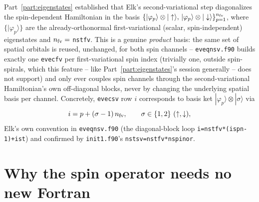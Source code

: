 \documentclass[11pt]{article}
\begin{document}
Part~\ref{part:eigenstates} established that Elk's second-variational step diagonalizes the
spin-dependent Hamiltonian in the basis
$\{|\varphi_p\rangle\otimes|\uparrow\rangle,\,|\varphi_p\rangle\otimes|\downarrow\rangle\}_{p=1}^{n_{\rm fv}}$,
where $\{|\varphi_p\rangle\}$ are the already-orthonormal first-variational (scalar,
spin-independent) eigenstates and $n_{\rm fv}=$ \texttt{nstfv}. This is a genuine \emph{product}
basis: the same set of spatial orbitals is reused, unchanged, for both spin channels --
\texttt{eveqnsv.f90} builds exactly one \texttt{evecfv} per first-variational spin index
(trivially one, outside spin-spirals, which this feature -- like Part~\ref{part:eigenstates}'s
session generally -- does not support) and only ever couples spin channels through the
second-variational Hamiltonian's own off-diagonal blocks, never by changing the underlying
spatial basis per channel. Concretely, \texttt{evecsv} row $i$ corresponds to basis ket
$|\varphi_p\rangle\otimes|\sigma\rangle$ via
\begin{equation}
  i = p + (\sigma-1)\,n_{\rm fv}, \qquad \sigma\in\{1,2\}\ (\uparrow,\downarrow),
  \label{eq:spinor-index}
\end{equation}
Elk's own convention in \texttt{eveqnsv.f90} (the diagonal-block loop
\texttt{i=nstfv*(ispn-1)+ist}) and confirmed by \texttt{init1.f90}'s
\texttt{nstsv=nstfv*nspinor}.

\section{Why the spin operator needs no new Fortran}
\end{document}
